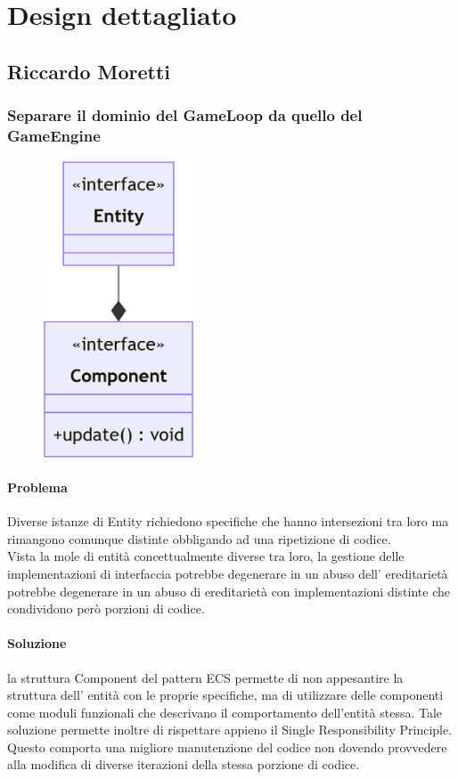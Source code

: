 \documentclass[a4paper,12pt]{report}
\begin{document}
\section{Design dettagliato}
%
\subsection*{Riccardo Moretti}
%
\subsubsection*{Separare il dominio del GameLoop da quello del GameEngine}
%
\begin{figure}[H]
    \centering{}
    \includegraphics[width=0.4\textwidth]{img/UMLEntita.png}
    \caption{}
\end{figure}
%
\paragraph*{Problema} Diverse istanze di Entity richiedono specifiche che hanno intersezioni tra loro ma rimangono comunque distinte obbligando ad una ripetizione di codice.
\\
Vista la mole di entità concettualmente diverse tra loro, la gestione delle implementazioni di interfaccia potrebbe degenerare in un abuso dell’ ereditarietà potrebbe degenerare in un abuso di ereditarietà con implementazioni distinte che condividono però porzioni di codice.
%
\paragraph*{Soluzione} la struttura Component del pattern ECS permette di non appesantire la struttura dell’ entità con le proprie specifiche, ma di utilizzare delle componenti come moduli funzionali che descrivano il comportamento dell’entità stessa.
Tale soluzione permette inoltre di rispettare appieno il Single Responsibility Principle. Questo comporta una migliore manutenzione del codice non dovendo provvedere alla modifica di diverse iterazioni della stessa porzione di codice.
\end{document}
